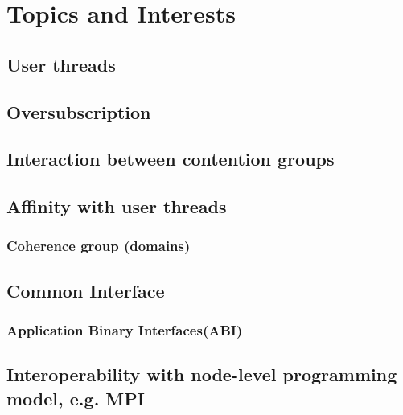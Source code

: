 \documentclass{article}
\begin{document}
\section{Topics and Interests}

\subsection{User threads}


\subsection{Oversubscription}


\subsection{Interaction between contention groups}

\subsection{Affinity with user threads}
\subsubsection{Coherence group (domains)}

\subsection{Common Interface}
\subsubsection{Application Binary Interfaces(ABI)}

\subsection{Interoperability with node-level programming model, e.g. MPI}
\end{document}
